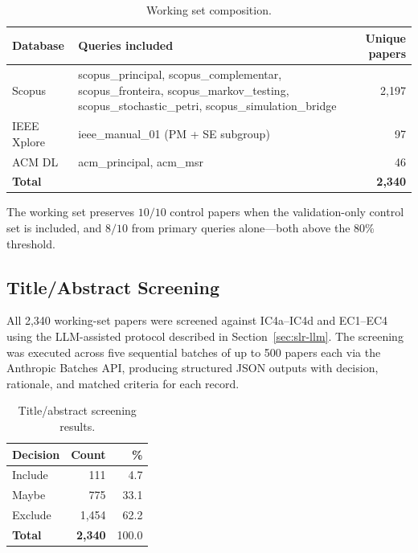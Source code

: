 \begin{table}[htbp]
\centering
\caption{Working set composition.}
\label{tab:working-set}
\small
\setlength{\tabcolsep}{4pt}
\begin{tabular}{p{2.2cm} p{8.3cm} r}
\toprule
\textbf{Database} & \textbf{Queries included} & \textbf{Unique papers} \\
\midrule
Scopus & scopus\_principal, scopus\_complementar, scopus\_fronteira,
         scopus\_markov\_testing, scopus\_stochastic\_petri,
         scopus\_simulation\_bridge & 2{,}197 \\
IEEE Xplore & ieee\_manual\_01 (PM + SE subgroup) & 97 \\
ACM DL & acm\_principal, acm\_msr & 46 \\
\midrule
\textbf{Total} & & \textbf{2{,}340} \\
\bottomrule
\end{tabular}
\end{table}

The working set preserves $10/10$ control papers when the validation-only
control set is included, and $8/10$ from primary queries alone---both above
the 80\% threshold.

\subsection{Title/Abstract Screening}

All 2{,}340 working-set papers were screened against IC4a--IC4d and EC1--EC4
using the LLM-assisted protocol described in Section~\ref{sec:slr-llm}. The
screening was executed across five sequential batches of up to 500 papers each
via the Anthropic Batches API, producing structured JSON outputs with decision,
rationale, and matched criteria for each record.

\begin{table}[htbp]
\centering
\caption{Title/abstract screening results.}
\label{tab:ta-screening}
\begin{tabular}{lrr}
\toprule
\textbf{Decision} & \textbf{Count} & \textbf{\%} \\
\midrule
Include & 111 & 4.7 \\
Maybe   & 775 & 33.1 \\
Exclude & 1{,}454 & 62.2 \\
\midrule
\textbf{Total} & \textbf{2{,}340} & 100.0 \\
\bottomrule
\end{tabular}
\end{table}

